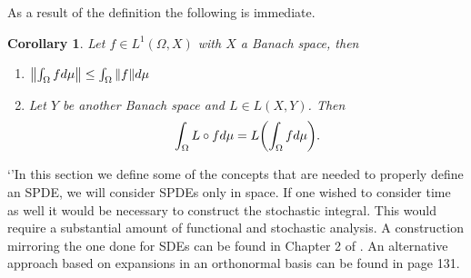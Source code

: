 \documentclass[12pt]{article}
\newtheorem{corollary}{Corollary}
\begin{document}
As a result of the definition the following is immediate.
\begin{corollary}
	Let $f\in L^1(\Omega,X)$ with $X$ a Banach space, then
	\begin{enumerate}
		\item $\norm{\int_\Omega f d\mu}\leq\int_\Omega{\norm{f}d\mu} $
		\item Let $Y$ be another Banach space and $L\in L(X,Y)$. Then
		      \begin{equation*}
			      \int_\Omega L\circ f d\mu=L\qty(\int_\Omega f d\mu).
		      \end{equation*}
	\end{enumerate}
\end{corollary}
`'In this section we define some of the concepts that are needed to properly define an SPDE, we will consider SPDEs only in space. If one wished to consider time as well it would be necessary to construct the stochastic integral. This would require a substantial amount of functional and stochastic analysis. A construction mirroring the one done for SDEs can be found in Chapter 2 of \cite{liu2015stochastic}. An alternative approach based on expansions in an orthonormal basis can be found in \cite{lototsky2017stochastic} page 131.
\end{document}
